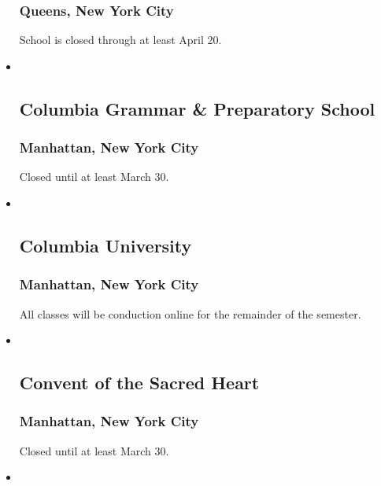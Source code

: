 \begin{itemize}
  \hypertarget{queens-new-york-city}{%
  \subsubsection{Queens, New York City}\label{queens-new-york-city}}

  School is closed through at least April 20.
\item ~
  \hypertarget{columbia-grammar--preparatory-school}{%
  \subsection{Columbia Grammar \& Preparatory
  School}\label{columbia-grammar--preparatory-school}}

  \hypertarget{manhattan-new-york-city-1}{%
  \subsubsection{Manhattan, New York
  City}\label{manhattan-new-york-city-1}}

  Closed until at least March 30.
\item ~
  \hypertarget{columbia-university}{%
  \subsection{Columbia University}\label{columbia-university}}

  \hypertarget{manhattan-new-york-city-2}{%
  \subsubsection{Manhattan, New York
  City}\label{manhattan-new-york-city-2}}

  All classes will be conduction online for the remainder of the
  semester.
\item ~
  \hypertarget{convent-of-the-sacred-heart}{%
  \subsection{Convent of the Sacred
  Heart}\label{convent-of-the-sacred-heart}}

  \hypertarget{manhattan-new-york-city-3}{%
  \subsubsection{Manhattan, New York
  City}\label{manhattan-new-york-city-3}}

  Closed until at least March 30.
\item ~
  \hypertarget{cornell-university}{%
}
\end{itemize}
